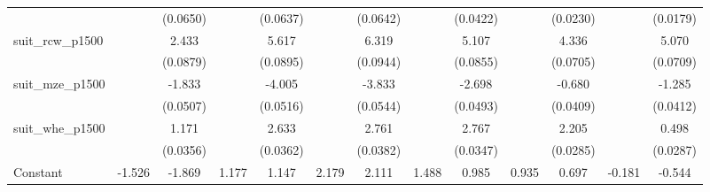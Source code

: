 {\begin{tabular}{l*{12}{c}}
                    &                     &    (0.0650)         &                     &    (0.0637)         &                     &    (0.0642)         &                     &    (0.0422)         &                     &    (0.0230)         &                     &    (0.0179)         \\
\addlinespace
suit\_rcw\_p1500      &                     &       2.433\sym{***}&                     &       5.617\sym{***}&                     &       6.319\sym{***}&                     &       5.107\sym{***}&                     &       4.336\sym{***}&                     &       5.070\sym{***}\\
                    &                     &    (0.0879)         &                     &    (0.0895)         &                     &    (0.0944)         &                     &    (0.0855)         &                     &    (0.0705)         &                     &    (0.0709)         \\
\addlinespace
suit\_mze\_p1500      &                     &      -1.833\sym{***}&                     &      -4.005\sym{***}&                     &      -3.833\sym{***}&                     &      -2.698\sym{***}&                     &      -0.680\sym{***}&                     &      -1.285\sym{***}\\
                    &                     &    (0.0507)         &                     &    (0.0516)         &                     &    (0.0544)         &                     &    (0.0493)         &                     &    (0.0409)         &                     &    (0.0412)         \\
\addlinespace
suit\_whe\_p1500      &                     &       1.171\sym{***}&                     &       2.633\sym{***}&                     &       2.761\sym{***}&                     &       2.767\sym{***}&                     &       2.205\sym{***}&                     &       0.498\sym{***}\\
                    &                     &    (0.0356)         &                     &    (0.0362)         &                     &    (0.0382)         &                     &    (0.0347)         &                     &    (0.0285)         &                     &    (0.0287)         \\
\addlinespace
Constant            &      -1.526\sym{***}&      -1.869\sym{***}&       1.177\sym{***}&       1.147\sym{***}&       2.179\sym{***}&       2.111\sym{***}&       1.488\sym{***}&       0.985\sym{***}&       0.935\sym{***}&       0.697\sym{**} &      -0.181         &      -0.544\sym{*}  \\

\end{tabular}}
